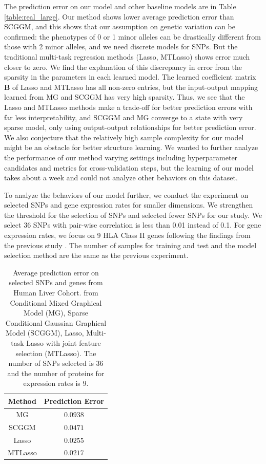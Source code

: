 \documentclass{article}
\begin{document}
The prediction error on our model and other baseline models are in Table \ref{table:real_large}. Our method shows lower average prediction error than SCGGM, and this shows that our assumption on genetic variation can be confirmed: the phenotypes of 0 or 1 minor alleles can be drastically different from those with 2 minor alleles, and we need discrete models for SNPs. But the traditional multi-task regression methods (Lasso, MTLasso) shows error much closer to zero. We find the explanation of this discrepancy in error from the sparsity in the parameters in each learned model. The learned coefficient matrix $\textbf{B}$ of Lasso and MTLasso has all non-zero entries, but the input-output mapping learned from MG and SCGGM has very high sparsity. Thus, we see that the Lasso and MTLasso methods make a trade-off for better prediction errors with far less interpretability, and SCGGM and MG converge to a state with very sparse model, only using output-output relationships for better prediction error. We also conjecture that the relatively high sample complexity for our model might be an obstacle for better structure learning. We wanted to further analyze the performance of our method varying settings including hyperparameter candidates and metrics for cross-validation steps, but the learning of our model takes about a week and could not analyze other behaviors on this dataset.

To analyze the behaviors of our model further, we conduct the experiment on selected SNPs and gene expression rates for smaller dimensions. We strengthen the threshold for the selection of SNPs and selected fewer SNPs for our study. We select 36 SNPs with pair-wise correlation is less than 0.01 instead of 0.1. For gene expression rates, we focus on 9 HLA Class II genes following the findings from the previous study \cite{burton2007genome}. The number of samples for training and test and the model selection method are the same as the previous experiment.

\begin{table}
\begin{center}
    \begin{tabular}{| c | c |}
    \hline
    Method & Prediction Error \\
    \hline
    MG & $0.0938$ \\
    SCGGM & $0.0471$  \\
    Lasso & $0.0255$  \\
    MTLasso & $0.0217$ \\
    \hline 
    \end{tabular}
\end{center}
\caption{Average prediction error on selected SNPs and genes from Human Liver Cohort. from Conditional Mixed Graphical Model (MG), Sparse Conditional Gaussian Graphical Model (SCGGM), Lasso, Multi-task Lasso with joint feature selection (MTLasso). The number of SNPs selected is 36 and the number of proteins for expression rates is 9.}
\label{table:real_small}
\end{table}
\end{document}
